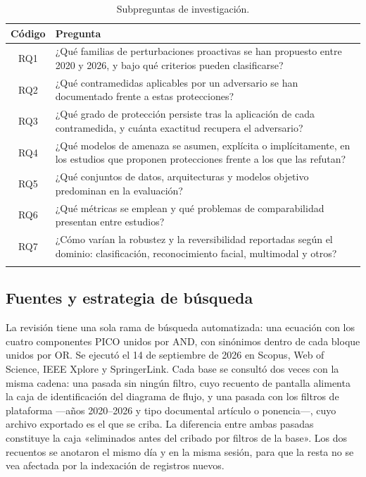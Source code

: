 \documentclass[pdflatex,sn-mathphys-num]{sn-jnl}
\theoremstyle{thmstyleone}
\theoremstyle{thmstyletwo}
\theoremstyle{thmstylethree}
\begin{document}
\begin{table}[h]
\centering
\caption{Subpreguntas de investigación.}\label{tab:rqs}
\begin{tabularx}{\textwidth}{@{}cX@{}}
\toprule
Código & Pregunta \\
\midrule
RQ1 & ¿Qué familias de perturbaciones proactivas se han propuesto entre 2020 y 2026, y bajo qué criterios pueden clasificarse? \\
RQ2 & ¿Qué contramedidas aplicables por un adversario se han documentado frente a estas protecciones? \\
RQ3 & ¿Qué grado de protección persiste tras la aplicación de cada contramedida, y cuánta exactitud recupera el adversario? \\
RQ4 & ¿Qué modelos de amenaza se asumen, explícita o implícitamente, en los estudios que proponen protecciones frente a los que las refutan? \\
RQ5 & ¿Qué conjuntos de datos, arquitecturas y modelos objetivo predominan en la evaluación? \\
RQ6 & ¿Qué métricas se emplean y qué problemas de comparabilidad presentan entre estudios? \\
RQ7 & ¿Cómo varían la robustez y la reversibilidad reportadas según el dominio: clasificación, reconocimiento facial, multimodal y otros? \\
\botrule
\end{tabularx}
\end{table}

\subsection{Fuentes y estrategia de búsqueda}\label{sec:busqueda}

La revisión tiene una sola rama de búsqueda automatizada: una ecuación con los cuatro componentes PICO unidos por AND, con sinónimos dentro de cada bloque unidos por OR. Se ejecutó el 14 de septiembre de 2026 en Scopus, Web of Science, IEEE Xplore y SpringerLink. Cada base se consultó dos veces con la misma cadena: una pasada sin ningún filtro, cuyo recuento de pantalla alimenta la caja de identificación del diagrama de flujo, y una pasada con los filtros de plataforma ---años 2020--2026 y tipo documental artículo o ponencia---, cuyo archivo exportado es el que se criba. La diferencia entre ambas pasadas constituye la caja «eliminados antes del cribado por filtros de la base». Los dos recuentos se anotaron el mismo día y en la misma sesión, para que la resta no se vea afectada por la indexación de registros nuevos.
\end{document}
